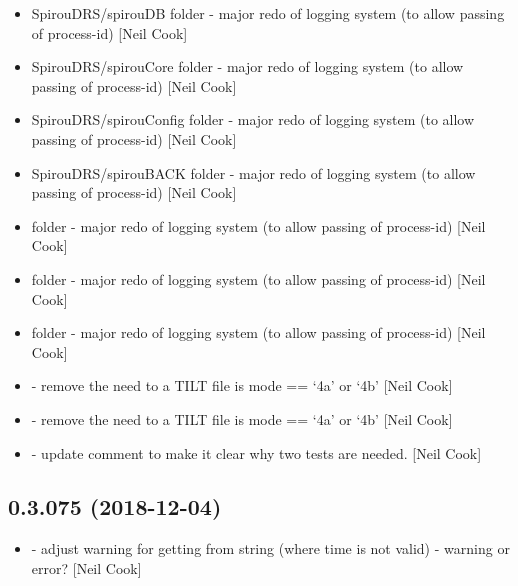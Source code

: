 \documentclass[a4paper,10pt,english]{report}
\begin{document}
\begin{itemize}
\item {} 
SpirouDRS/spirouDB folder - major redo of logging system (to allow
passing of process-id) {[}Neil Cook{]}

\item {} 
SpirouDRS/spirouCore folder - major redo of logging system (to allow
passing of process-id) {[}Neil Cook{]}

\item {} 
SpirouDRS/spirouConfig folder - major redo of logging system (to allow
passing of process-id) {[}Neil Cook{]}

\item {} 
SpirouDRS/spirouBACK folder - major redo of logging system (to allow
passing of process-id) {[}Neil Cook{]}

\item {} 
 folder - major redo of logging system (to allow
passing of process-id) {[}Neil Cook{]}

\item {} 
 folder - major redo of logging system (to allow passing
of process-id) {[}Neil Cook{]}

\item {} 
 folder - major redo of logging system (to allow passing
of process-id) {[}Neil Cook{]}

\item {} 
 - remove the need to a TILT file is mode ==
‘4a’ or ‘4b’ {[}Neil Cook{]}

\item {} 
 - remove the need to a TILT file is mode ==
‘4a’ or ‘4b’ {[}Neil Cook{]}

\item {} 
 - update comment to make it clear why two tests
are needed. {[}Neil Cook{]}

\end{itemize}


\subsection{0.3.075 (2018-12-04)}
\label{\detokenize{misc/changelog:id248}}\begin{itemize}
\item {} 
 - adjust warning for getting  from string
(where time is not valid) - warning or error? {[}Neil Cook{]}

\end{itemize}
\end{document}
